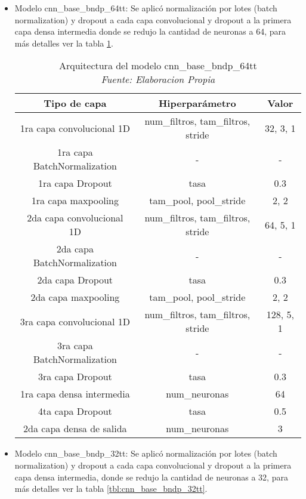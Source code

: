 \begin{itemize}
\item Modelo cnn\_base\_bndp\_64tt: Se aplicó normalización por lotes (batch normalization) y dropout a cada capa convolucional y dropout a la primera capa densa intermedia donde se redujo la cantidad de neuronas a 64, para más detalles ver la tabla \ref{tbl:cnn_base_bndp_64tt}.

\begin{table}[!ht]
	\centering
	\begin{tabular}{|c|c|c|}
		\hline
		\textbf{Tipo de capa} & \textbf{Hiperparámetro} & \textbf{Valor} \\ \hline
		1ra capa convolucional 1D & num\_filtros, tam\_filtros, stride & 32, 3, 1 \\ \hline
		1ra capa BatchNormalization & - & - \\ \hline
		1ra capa Dropout & tasa & 0.3 \\ \hline
		1ra capa maxpooling & tam\_pool, pool\_stride & 2, 2 \\ \hline
		2da capa convolucional 1D & num\_filtros, tam\_filtros, stride & 64, 5, 1 \\ \hline
		2da capa BatchNormalization & - & - \\ \hline
		2da capa Dropout & tasa & 0.3 \\ \hline
		2da capa maxpooling & tam\_pool, pool\_stride & 2, 2 \\ \hline
		3ra capa convolucional 1D & num\_filtros, tam\_filtros, stride & 128, 5, 1 \\ \hline
		3ra capa BatchNormalization & - & - \\ \hline
		3ra capa Dropout & tasa & 0.3 \\ \hline
		1ra capa densa intermedia & num\_neuronas & 64 \\ \hline
		4ta capa Dropout & tasa & 0.5 \\ \hline
		2da capa densa de salida & num\_neuronas & 3 \\ \hline
	\end{tabular}
	\caption{Arquitectura del modelo cnn\_base\_bndp\_64tt
		\\\textit{Fuente: Elaboracion Propia}}
	\label{tbl:cnn_base_bndp_64tt}
\end{table}


\item Modelo cnn\_base\_bndp\_32tt: Se aplicó normalización por lotes (batch normalization) y dropout a cada capa convolucional y dropout a la primera capa densa intermedia, donde se redujo la cantidad de neuronas a 32, para más detalles ver la tabla \ref{tbl:cnn_base_bndp_32tt}.


\end{itemize}

